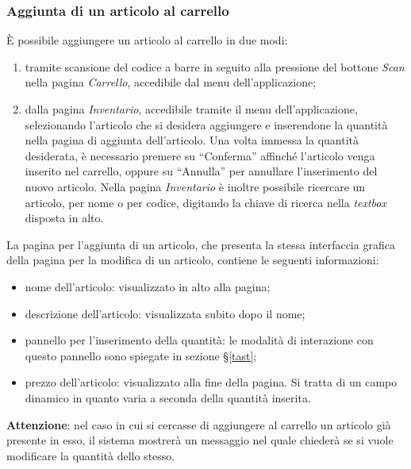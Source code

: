 \documentclass[12pt, a4paper, titlepage]{report}
\begin{document}
	\subsubsection{Aggiunta di un articolo al carrello}
	È possibile aggiungere un articolo al carrello in due modi: 
	\begin{enumerate}
		\item tramite scansione del codice a barre in seguito alla pressione del bottone \textit{Scan} nella pagina \textit{Carrello}, accedibile dal menu dell'applicazione;
		\item dalla pagina \textit{Inventario}, accedibile tramite il menu dell'applicazione, selezionando l'articolo che si desidera aggiungere e inserendone la quantità nella pagina di aggiunta dell'articolo. Una volta immessa la quantità desiderata, è necessario premere su ``Conferma'' affinché l'articolo venga inserito nel carrello, oppure su ``Annulla'' per annullare l'inserimento del nuovo articolo. Nella pagina \textit{Inventario} è inoltre possibile ricercare un articolo, per nome o per codice, digitando la chiave di ricerca nella \textit{textbox} disposta in alto.
	\end{enumerate}
	La pagina per l'aggiunta di un articolo, che presenta la stessa interfaccia grafica della pagina per la modifica di un articolo, contiene le seguenti informazioni:
	\begin{itemize}
		\item nome dell'articolo: visualizzato in alto alla pagina;
		\item descrizione dell'articolo: visualizzata subito dopo il nome;
		\item pannello per l'inserimento della quantità: le modalità di interazione con questo pannello sono spiegate in sezione §\ref{tast};
		\item prezzo dell'articolo: visualizzato alla fine della pagina. Si tratta di un campo dinamico in quanto varia a seconda della quantità inserita.
	\end{itemize}
	\textbf{Attenzione}: nel caso in cui si cercasse di aggiungere al carrello un articolo già presente in esso, il sistema mostrerà un messaggio nel quale chiederà se si vuole modificare la quantità dello stesso.
	
\end{document}
